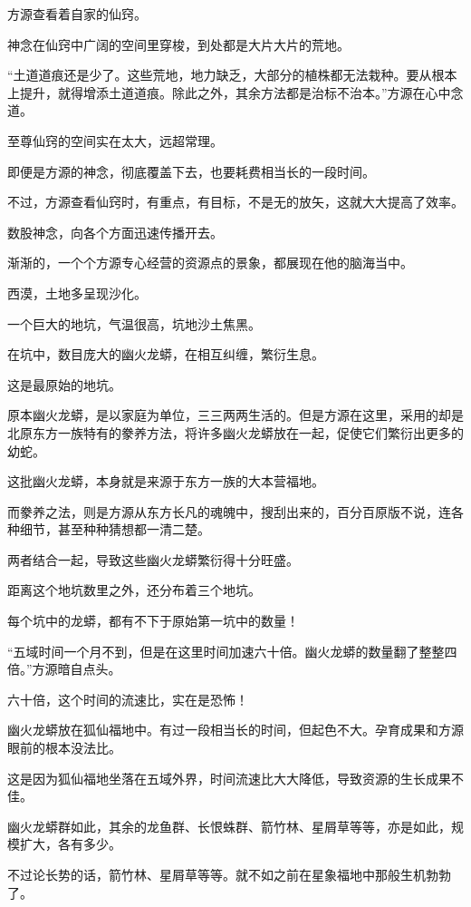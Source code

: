 
\begin{this_body}

方源查看着自家的仙窍。

神念在仙窍中广阔的空间里穿梭，到处都是大片大片的荒地。

“土道道痕还是少了。这些荒地，地力缺乏，大部分的植株都无法栽种。要从根本上提升，就得增添土道道痕。除此之外，其余方法都是治标不治本。”方源在心中念道。

至尊仙窍的空间实在太大，远超常理。

即便是方源的神念，彻底覆盖下去，也要耗费相当长的一段时间。

不过，方源查看仙窍时，有重点，有目标，不是无的放矢，这就大大提高了效率。

数股神念，向各个方面迅速传播开去。

渐渐的，一个个方源专心经营的资源点的景象，都展现在他的脑海当中。

西漠，土地多呈现沙化。

一个巨大的地坑，气温很高，坑地沙土焦黑。

在坑中，数目庞大的幽火龙蟒，在相互纠缠，繁衍生息。

这是最原始的地坑。

原本幽火龙蟒，是以家庭为单位，三三两两生活的。但是方源在这里，采用的却是北原东方一族特有的豢养方法，将许多幽火龙蟒放在一起，促使它们繁衍出更多的幼蛇。

这批幽火龙蟒，本身就是来源于东方一族的大本营福地。

而豢养之法，则是方源从东方长凡的魂魄中，搜刮出来的，百分百原版不说，连各种细节，甚至种种猜想都一清二楚。

两者结合一起，导致这些幽火龙蟒繁衍得十分旺盛。

距离这个地坑数里之外，还分布着三个地坑。

每个坑中的龙蟒，都有不下于原始第一坑中的数量！

“五域时间一个月不到，但是在这里时间加速六十倍。幽火龙蟒的数量翻了整整四倍。”方源暗自点头。

六十倍，这个时间的流速比，实在是恐怖！

幽火龙蟒放在狐仙福地中。有过一段相当长的时间，但起色不大。孕育成果和方源眼前的根本没法比。

这是因为狐仙福地坐落在五域外界，时间流速比大大降低，导致资源的生长成果不佳。

幽火龙蟒群如此，其余的龙鱼群、长恨蛛群、箭竹林、星屑草等等，亦是如此，规模扩大，各有多少。

不过论长势的话，箭竹林、星屑草等等。就不如之前在星象福地中那般生机勃勃了。


\end{this_body}
